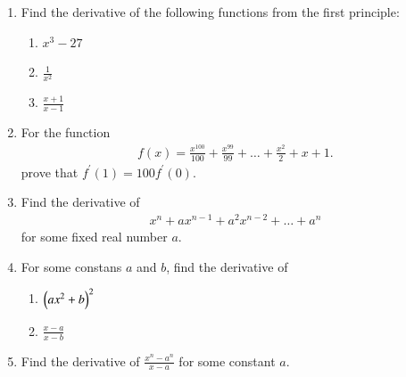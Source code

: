\begin{enumerate}[label=\arabic*.,ref=\thesubsection.\theenumi]
\item Find the derivative of the following functions from the first principle:
%
\begin{enumerate}
\item  $x^3-27$
\item  $\frac{1}{x^2}$
\item  $\frac{x+1}{x-1}$
\end{enumerate}
%
\item For the function 
\begin{align}
f(x) = \frac{x^100}{100} + \frac{x^99}{99} + \dots + \frac{x^2}{2} + x + 1.
\end{align}
%
prove that $f^{'}(1) = 100f^{'}(0) $.
%
\item Find the derivative of 
\begin{align}
x^n+ax^{n-1}+a^2x^{n-2}+\dots+a^n
\end{align}
%
for some fixed real number $a$.
%
\item For some constans $a$ and $b$, find the derivative of
%
\begin{enumerate}
\item  $\left(ax^2+b\right)^2$
\item  $\frac{x-a}{x-b}$
\end{enumerate}
%
\item Find the derivative of $\frac{x^n-a^n}{x-a}$ for some constant $a$.
%


\end{enumerate}
